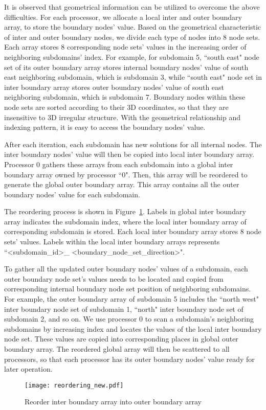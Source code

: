 \documentclass{sig-alternate}
\begin{document}
	It is observed that geometrical information can be utilized to overcome the above difficulties. For each processor, we allocate 
	a local inter and outer boundary array, to store the boundary nodes' value. Based on the geometrical 
	characteristic of inter and outer boundary nodes, we divide each type of nodes into 8 node sets. Each array stores 8 
	corresponding node sets' values in the increasing order of neighboring subdomains' index.  
	For example, for subdomain 5, ``south east" node set of its outer boundary array stores internal boundary nodes' value of 
	south east neighboring subdomain, which is subdomain 3, while ``south east" node set in inter boundary array stores outer 
	boundary nodes' value of south east neighboring subdomain, which is subdomain 7. Boundary nodes within 
	these node sets are sorted according to their 3D coordinates, so that they are insensitive to 3D irregular structure. With the
	geometrical relationship and indexing pattern, it is easy to access the boundary nodes' value. 

	After each iteration, each subdomain has new solutions for all internal nodes. The inter 
	boundary nodes' value will then be copied into local inter boundary array. Processor 0 gathers these arrays from each subdomain
	into a global inter boundary array owned by processor ``0". Then, this array will be reordered to generate the global outer 
	boundary array. This array
	contains all the outer boundary nodes' value for each subdomain. 

	The reordering process is shown in Figure~\ref{Fig4}. Labels in global inter boundary array indicates the subdomain index, where
	the local inter boundary array of corresponding subdomain is stored. Each local inter boundary array stores 8 node sets' values. 
	Labels within the local inter boundary arrays represents ``<subdomain\_id>\_
	<boundary\_node\_set\_direction>".

	To gather all the updated outer boundary nodes' values of a subdomain, each outer boundary node set's values needs to be located
	and copied from corresponding internal boundary node set position of neighboring subdomains. For example, the 
	outer boundary array of subdomain 5 includes the ``north west" inter boundary node set of subdomain 1, ``north" inter boundary 
	node set of 
	subdomain 2, and so on. We use processor 0 to scan a subdomain's neighboring subdomains by increasing index and locates the
	values of the 
	local inter boundary node set. These values are copied into corresponding places in global outer boundary array. The 
	reordered global array will then be scattered to all processors, so that each processor has its outer boundary nodes' value 
	ready for later operation. 
	\begin{figure}[htbp]
	  \centering
	  \texttt{[image: reordering\_new.pdf]}
	  \caption{Reorder inter boundary array into outer boundary array}
	  \label{Fig4}
	\end{figure}
\end{document}
